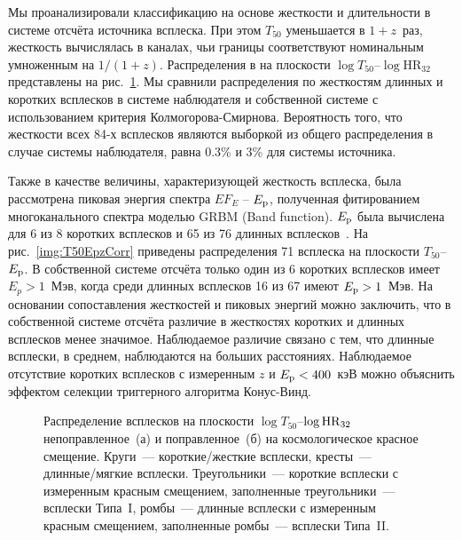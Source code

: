 Мы проанализировали классификацию на основе жесткости и длительности в системе 
отсчёта источника всплеска. При этом $T_{50}$ уменьшается в $1+z$~раз, жесткость 
вычислялась в каналах, чьи границы соответствуют номинальным умноженным на $1/(1+z)$. 
Распределения в на плоскости $\log T_{50}$--$\log \mbox{HR}_{32}$ представлены на 
рис.~\ref{img:T50HRzCorr}.  Мы сравнили распределения по жесткостям длинных и 
коротких всплесков в системе наблюдателя и собственной системе с использованием 
критерия Колмогорова-Смирнова. Вероятность того, что жесткости всех 84-х всплесков 
являются выборкой из общего распределения в случае системы наблюдателя, 
равна 0.3\% и 3\% для системы источника.  

Также в качестве величины, характеризующей жесткость всплеска, была рассмотрена 
пиковая энергия спектра $E F_E$ -- $E_{{\mathrm{p}}}$, полученная фитированием многоканального 
спектра моделью GRBM (Band function). $E_{{\mathrm{p}}}$ была вычислена для 6 из 8 коротких 
всплесков и 65 из 76 длинных всплесков~\citep{Tsvetkova_2014}. На рис.~\ref{img:T50EpzCorr} 
приведены распределения 71 всплеска на плоскости $T_{50}$--$E_{{\mathrm{p}}}$. В собственной системе 
отсчёта только один из 6 коротких всплесков имеет $E_p > 1$~Мэв, когда среди длинных 
всплесков 16 из 67 имеют $E_{{\mathrm{p}}} > 1$~Мэв. На основании сопоставления жесткостей 
и пиковых энергий можно заключить, что в собственной системе отсчёта 
различие в жесткостях коротких и длинных всплесков менее значимое. Наблюдаемое 
различие связано с тем, что длинные всплески, в среднем, наблюдаются на больших 
расстояниях. Наблюдаемое отсутствие коротких всплесков с измеренным $z$ 
и $E_{{\mathrm{p}}} <400$~кэВ можно объяснить эффектом селекции триггерного алгоритма Конус-Винд. 

\begin{figure}[h]
  \begin{minipage}[h]{0.5\textwidth}
  \end{minipage}
  \hfill
  \begin{minipage}[h]{0.5\textwidth}
  \end{minipage}
  \caption{Распределение всплесков на плоскости $\log T_{50}$--$\log {\mathrm{HR}}_{32}$ 
  непоправленное~(а) и поправленное~(б) на космологическое красное смещение. 
  Круги~--- короткие/жесткие всплески, кресты~--- длинные/мягкие всплески. 
  Треугольники~--- короткие всплески с измеренным красным смещением, 
  заполненные треугольники~--- всплески Типа~I, ромбы~--- длинные всплески с 
  измеренным красным смещением, заполненные ромбы~--- всплески Типа~II.}
  \label{img:T50HRzCorr}  
\end{figure}

